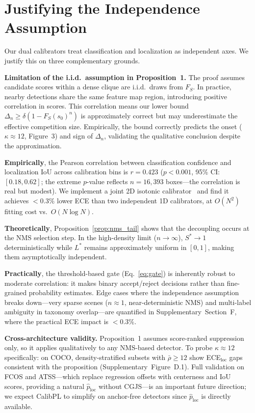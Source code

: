 \documentclass[10pt,twocolumn,letterpaper]{article}
\begin{document}
\section{Justifying the Independence Assumption}
\label{sec:independence}

Our dual calibrators treat classification and localization as independent axes.
We justify this on three complementary grounds.

\textbf{Limitation of the i.i.d.\ assumption in Proposition~1.}
The proof assumes candidate scores within a dense clique are i.i.d.\ draws
from $F_S$. In practice, nearby detections share the same feature map region,
introducing positive correlation in scores. This correlation means our
lower bound $\Delta_n\ge\delta(1-F_S(s_0)^n)$ is approximately correct
but may underestimate the effective competition size. Empirically, the bound
correctly predicts the onset ($\kappa{\approx}12$, Figure~3) and sign of
$\Delta_n$, validating the qualitative conclusion despite the approximation.

\textbf{Empirically}, the Pearson correlation between classification confidence
and localization IoU across calibration bins is $r{=}0.423$
($p{<}0.001$, 95\% CI: $[0.18,0.62]$; the extreme $p$-value reflects
$n{=}16{,}393$ boxes---the correlation is real but modest). We implement a joint 2D
isotonic calibrator~\cite{luss2019isotonic} and find it achieves ${<}0.3\%$
lower ECE than two independent 1D calibrators, at $O(N^2)$ fitting cost
vs.\ $O(N\log N)$.

\textbf{Theoretically}, Proposition~\ref{prop:nms_tail} shows that the
decoupling occurs at the NMS selection step. In the high-density limit
($n\to\infty$), $S^*\to1$ deterministically while $L^*$ remains approximately
uniform in $[0,1]$, making them asymptotically independent.

\textbf{Practically}, the threshold-based gate (Eq.~\ref{eq:gate}) is inherently
robust to moderate correlation: it makes binary accept/reject decisions rather
than fine-grained probability estimates. Edge cases where the independence
assumption breaks down---very sparse scenes ($n{\approx}1$, near-deterministic
NMS) and multi-label ambiguity in taxonomy overlap---are quantified in
Supplementary~Section~F, where the practical ECE impact is ${<}0.3\%$.

\textbf{Cross-architecture validity.}
Proposition~1 assumes score-ranked suppression only, so it applies qualitatively
to any NMS-based detector. To probe $\kappa{\approx}12$ specifically: on COCO,
density-stratified subsets with $\bar{\rho}{\ge}12$ show ECE$_\text{loc}$
gaps consistent with the proposition (Supplementary~Figure~D.1). Full
validation on FCOS and ATSS---which replace regression offsets with centerness
and IoU scores, providing a natural $\hat{p}_\text{loc}$ without CGJS---is
an important future direction; we expect CalibPL to simplify on anchor-free
detectors since $\hat{p}_\text{loc}$ is directly available.
\end{document}
